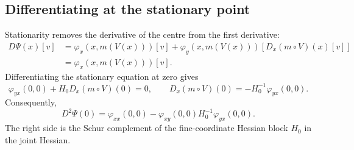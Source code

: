 \documentclass[10pt,reqno]{amsart}
\theoremstyle{definition}
\theoremstyle{remark}
\numberwithin{equation}{section}
\numberwithin{figure}{section}
\begin{document}
\subsection{Differentiating at the stationary point}
Stationarity removes the derivative of the centre from the first
derivative:
\begin{equation}\label{eq:stationary-energy-first-derivative}
\begin{aligned}
D\Psi(x)[v]
&=\varphi_x(x,m(V(x)))[v]
+\varphi_y(x,m(V(x)))[D_x(m\circ V)(x)[v]]\\
&=\varphi_x(x,m(V(x)))[v].
\end{aligned}
\end{equation}
Differentiating the stationary equation at zero gives
\begin{equation}\label{eq:stationary-centre-linear-response}
\varphi_{yx}(0,0)+H_0D_x(m\circ V)(0)=0,\qquad
D_x(m\circ V)(0)=-H_0^{-1}\varphi_{yx}(0,0).
\end{equation}
Consequently,
\begin{equation}\label{eq:stationary-energy-schur-complement}
\boxed{D^2\Psi(0)
=\varphi_{xx}(0,0)
-\varphi_{xy}(0,0)H_0^{-1}\varphi_{yx}(0,0).}
\end{equation}
The right side is the Schur complement of the fine-coordinate Hessian
block $H_0$ in the joint Hessian.
\end{document}
